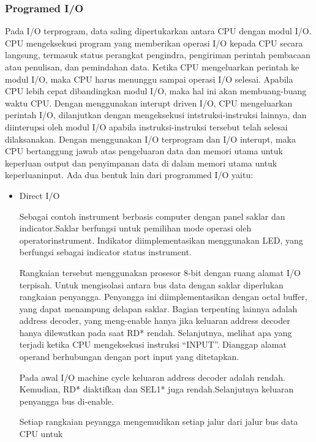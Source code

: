 \documentclass[12pt]{article}
\begin{document}
\begin{itemize}
\subsubsection{Programed I/O}
\par  Pada I/O terprogram, data saling dipertukarkan antara CPU dengan modul I/O. CPU
mengeksekusi program yang memberikan operasi I/O kepada CPU secara langsung,
termasuk status perangkat pengindra, pengiriman perintah pembacaan atau penulisan,
dan pemindahan data. Ketika CPU mengeluarkan perintah ke modul I/O, maka CPU
harus menunggu sampai operasi I/O selesai. Apabila CPU lebih cepat dibandingkan
modul I/O, maka hal ini akan membuang-buang waktu CPU. Dengan menggunakan
interupt driven I/O, CPU mengeluarkan perintah I/O, dilanjutkan dengan mengeksekusi
intstruksi-instruksi lainnya, dan diinterupsi oleh modul I/O apabila instruksi-instruksi
tersebut telah selesai dilaksanakan. Dengan menggunakan I/O terprogram dan I/O
interupt, maka CPU bertanggung jawab atas pengeluaran data dan memori utama untuk
keperluan output dan penyimpanan data di dalam memori utama untuk keperluaninput.
Ada dua bentuk lain dari programmed I/O yaitu:
\begin{itemize}
\item  Direct I/O
\par  Sebagai contoh instrument berbasis computer dengan panel saklar dan indicator.Saklar
berfungsi untuk pemilihan mode operasi oleh operatorinstrument. 
Indikator
diimplementasikan menggunakan LED, yang berfungsi sebagai indicator status
instrument.
\newline 
\par Rangkaian tersebut menggunakan prosesor 8-bit dengan ruang alamat I/O terpisah.
Untuk mengisolasi antara bus data dengan saklar diperlukan rangkaian penyangga.
Penyangga ini diimplementasikan dengan octal buffer, yang dapat menampung delapan
saklar. Bagian terpenting lainnya adalah address decoder, yang meng-enable hanya
jika keluaran address decoder hanya dilewatkan pada saat RD* rendah. Selanjutnya,
melihat apa yang terjadi ketika CPU mengeksekusi instruksi “INPUT”. Dianggap alamat
operand berhubungan dengan port input yang ditetapkan.
\newline
\par Pada awal I/O machine cycle keluaran address decoder adalah rendah. Kemudian, RD*
diaktifkan dan SEL1* juga rendah.Selanjutnya keluaran penyangga bus di-enable.
\newline
\par Setiap rangkaian peyangga mengemudikan setiap jalur dari jalur bus data CPU untuk

\end{itemize}
\end{itemize}
\end{document}
